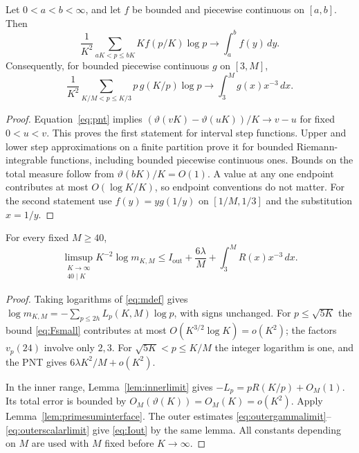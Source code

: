 \begin{lemma}
\label{lem:primesuminterface}
Let $0<a<b<\infty$, and let $f$ be bounded and piecewise continuous on
$[a,b]$. Then
\[
 \frac1{K^2}\sum_{aK<p\le bK}Kf(p/K)\log p
       \longrightarrow\int_a^b f(y)\,dy.
\]
Consequently, for bounded piecewise continuous $g$ on $[3,M]$,
\[
 \frac1{K^2}\sum_{K/M<p\le K/3}p\,g(K/p)\log p
       \longrightarrow\int_3^M g(x)x^{-3}\,dx.
\]
\end{lemma}
\begin{proof}
Equation~\eqref{eq:pnt} implies
$(\vartheta(vK)-\vartheta(uK))/K\to v-u$ for fixed $0<u<v$.
This proves the first statement for interval step functions. Upper and
lower step approximations on a finite partition prove it for bounded
Riemann-integrable functions, including bounded piecewise continuous
ones. Bounds on the total measure follow from
$\vartheta(bK)/K=O(1)$. A value at any one endpoint contributes at most
$O(\log K/K)$, so endpoint conventions do not matter. For the second
statement use $f(y)=y g(1/y)$ on $[1/M,1/3]$ and the substitution $x=1/y$.
\end{proof}

\begin{proposition}
\label{prop:primegrowth}
For every fixed $M\ge40$,
\begin{equation}\label{eq:primegrowth}
 \limsup_{\substack{K\to\infty\\40\mid K}}
 K^{-2}\log m_{K,M}
 \le I_{\mathrm{out}}+\frac{6\lambda}{M}
                         +\int_3^M R(x)x^{-3}\,dx.
\end{equation}
\end{proposition}
\begin{proof}
Taking logarithms of \eqref{eq:mdef} gives
$\log m_{K,M}=-\sum_{p\le2h}L_p(K,M)\log p$, with signs unchanged.
For $p\le\sqrt{5K}$ the bound \eqref{eq:Fsmall} contributes at most
$O(K^{3/2}\log K)=o(K^2)$; the factors $v_p(24)$ involve only $2,3$.
For $\sqrt{5K}<p\le K/M$ the integer logarithm is one, and the PNT gives
$6\lambda K^2/M+o(K^2)$.

In the inner range, Lemma~\ref{lem:innerlimit} gives
$-L_p=pR(K/p)+O_M(1)$. Its total error is bounded by
$O_M(\vartheta(K))=O_M(K)=o(K^2)$. Apply
Lemma~\ref{lem:primesuminterface}. The outer estimates
\eqref{eq:outergammalimit}--\eqref{eq:outerscalarlimit} give
\eqref{eq:Iout} by the same lemma. All constants depending on $M$ are
used with $M$ fixed before $K\to\infty$.
\end{proof}


